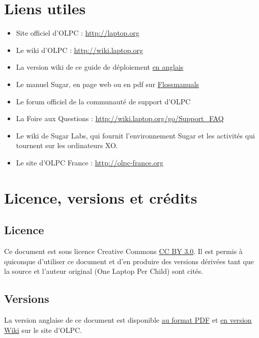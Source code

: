 \documentclass[11pt]{article}
\begin{document}
\section{Liens utiles}
\label{sec-12}


\begin{itemize}
\item Site officiel d'OLPC : \href{http://laptop.org}{http://laptop.org}
\item Le wiki d'OLPC : \href{http://wiki.laptop.org}{http://wiki.laptop.org}
\item La version wiki de ce guide de déploiement \href{http://wiki.laptop.org/go/Deployment_Guide}{en anglais}
\item Le manuel Sugar, en page web ou en pdf sur \href{http://en.flossmanuals.net/Sugar}{Flossmanuals}
\item Le forum officiel de la communauté de support d'OLPC
\item La Foire aux Questions : \href{http://wiki.laptop.org/go/Support_FAQ}{http://wiki.laptop.org/go/Support\_FAQ}
\item Le wiki de Sugar Labs, qui fournit l'environnement Sugar et les activités
  qui tournent sur les ordinateurs XO.
\item Le site d'OLPC France : \href{http://olpc-france.org}{http://olpc-france.org}
\end{itemize}
\section{Licence, versions et crédits}
\label{sec-13}
\subsection{Licence}
\label{sec-13-1}


Ce document est sous licence Creative Commons \href{http://creativecommons.org/licenses/by/3.0/}{CC BY 3.0}.  Il est permis à
quiconque d'utiliser ce document et d'en produire des versions dérivées
tant que la source et l'auteur original (One Laptop Per Child) sont cités.
\subsection{Versions}
\label{sec-13-2}


La version anglaise de ce document est disponible \href{http://wiki.laptop.org/images/1/1c/OLPC_Deployment_Guide_2011.pdf}{au format PDF} et \href{http://wiki.laptop.org/go/Deployment_Guide_2011}{en version Wiki} sur le site d'OLPC.
\end{document}
